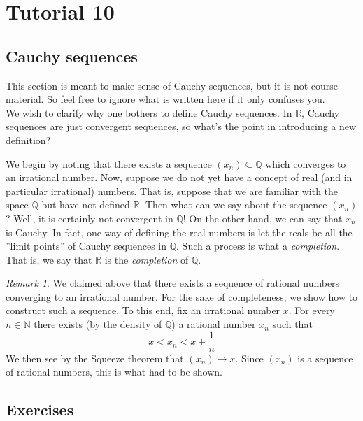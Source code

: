 \documentclass[12pt, reqno]{article}
\numberwithin{equation}{section}
\theoremstyle{definition}
\theoremstyle{remark}
\newtheorem{rem}{Remark}
\newcommand{\NN}{\mathbb{N}}
\newcommand{\QQ}{\mathbb{Q}}
\newcommand{\RR}{\mathbb{R}}
\begin{document}
\section*{Tutorial 10}

\subsection*{Cauchy sequences}
This section is meant to make sense of Cauchy sequences, but it is not course material. So feel free to ignore what is written here if it only confuses you.\\

We wish to clarify why one bothers to define Cauchy sequences. In $\RR$, Cauchy sequences are just convergent sequences, so what's the point in introducing a new definition?

We begin by noting that there exists a sequence $(x_n) \subseteq \QQ$ which converges to an irrational number.
Now, suppose we do not yet have a concept of real (and in particular irrational) numbers. That is, suppose that we are familiar with the space $\QQ$ but have not defined $\RR$. Then what can we say about the sequence $(x_n)$? Well, it is certainly not convergent in $\QQ$! On the other hand, we can say that $x_n$ is Cauchy. In fact, one way of defining the real numbers is let the reals be all the ''limit points'' of Cauchy sequences in $\QQ$. Such a process is what a \emph{completion}. That is, we say that $\RR$ is the \emph{completion} of $\QQ$.

\begin{rem}
	We claimed above that there exists a sequence of rational numbers converging to an irrational number. For the sake of completeness, we show how to construct such a sequence. To this end, fix an irrational number $x$. For every $n\in\NN$ there exists (by the density of $\QQ$) a rational number $x_n$ such that
	\[
		x < x_n < x + \frac{1}{n}
	\]
	We then see by the Squeeze theorem that $(x_n) \to x$. Since $(x_n)$ is a sequence of rational numbers, this is what had to be shown.
\end{rem}


\subsection*{Exercises}
\end{document}
